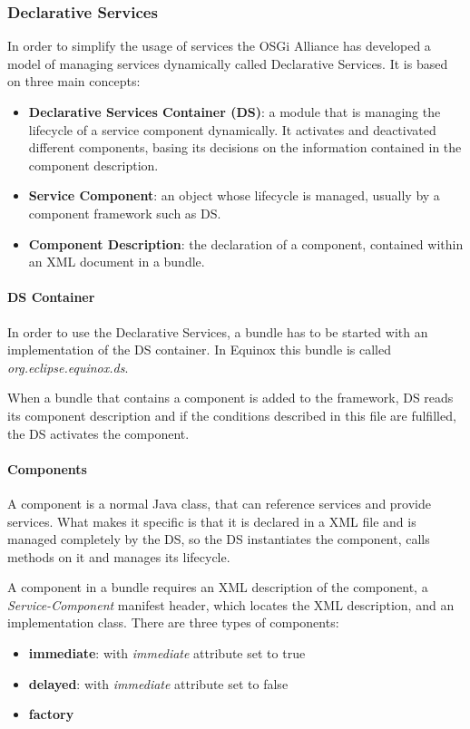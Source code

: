 \subsubsection{Declarative Services}
In order to simplify the usage of services the OSGi Alliance has developed a model of managing services dynamically called Declarative 
Services. It is based on three main concepts:

\begin{itemize}
	\item \textbf{Declarative Services Container (DS)}: a module that is managing the lifecycle of a service component dynamically. 
	It activates and deactivated different components, basing its decisions on the information contained in the component description.
	\item \textbf{Service Component}: an object whose lifecycle is managed, usually by a component framework such as DS.
	\item \textbf{Component Description}: the declaration of a component, contained within an XML document in a bundle.
\end{itemize}

\paragraph{DS Container}
In order to use the Declarative Services, a bundle has to be started with an implementation of the DS container. In Equinox this 
bundle is called \textit{org.eclipse.equinox.ds}.

When a bundle that contains a component is added to the framework, DS reads its component description and if the conditions 
described in this file are fulfilled, the DS activates the component.

\paragraph{Components}
A component is a normal Java class, that can reference services and provide services. What makes it specific is that it is declared
in a XML file and is managed completely by the DS, so the DS instantiates the component, calls methods on it and manages its 
lifecycle.

A component in a bundle requires an XML description of the component, a \textit{Service-Component} manifest header, which locates 
the XML description, and an implementation class. There are three types of components: 
\begin{itemize}
	\item \textbf{immediate}: with \textit{immediate} attribute set to true
	\item \textbf{delayed}: with \textit{immediate} attribute set to false
	\item \textbf{factory}
\end{itemize}

